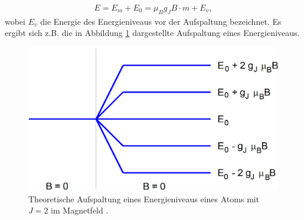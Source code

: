 \begin{gather}
	E=E_{m}+E_0=\mu_B g_J B \cdot m +E_v, \label{eq:ENiveau}
\end{gather}
wobei $E_v$ die Energie des Energieniveaus vor der Aufspaltung bezeichnet.
Es ergibt sich z.B. die in Abbildung \ref{fig:generelleAufspaltung} dargestellte Aufspaltung eines Energieniveaus.
\begin{figure}
	\centering
	\includegraphics[width=\linewidth-150pt,height=\textheight-150pt,keepaspectratio]{content/Images/generelleAufspaltung.png}
    \caption{Theoretische Aufspaltung eines Energieniveaus eines Atoms mit $J=2$ im Magnetfeld \cite{V27}.}
    \label{fig:generelleAufspaltung}
\end{figure}

